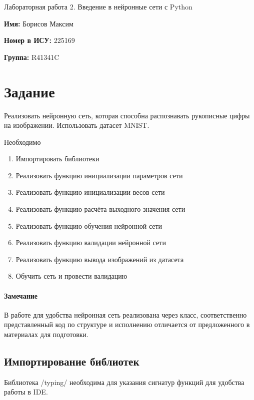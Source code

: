 \documentclass[14pt]{extarticle}
\begin{document}
    \begin{center}
        \Large Лабораторная работа 2. Введение в нейронные сети с Python
    \end{center}
    \begin{flushleft}
        \textbf{Имя:} Борисов Максим

        \vspace{1em}
        \textbf{Номер в ИСУ:} 225169

        \vspace{1em}
        \textbf{Группа:} R41341C
    \end{flushleft}

    \section*{Задание}
    Реализовать нейронную сеть, которая способна распознавать рукописные цифры
    на изображении. Использовать датасет MNIST.

    \vspace{1em}
    Необходимо
    \begin{enumerate}
        \item Импортировать библиотеки
        \item Реализовать функцию инициализации параметров сети
        \item Реализовать функцию инициализации весов сети
        \item Реализовать функцию расчёта выходного значения сети
        \item Реализовать функцию обучения нейронной сети
        \item Реализовать функцию валидации нейронной сети
        \item Реализовать функцию вывода изображений из датасета
        \item Обучить сеть и провести валидацию
    \end{enumerate}

    \pagebreak

    \paragraph*{Замечание}
    В работе для удобства нейронная сеть реализована через класс, соответственно представленный код
    по структуре и исполнению отличается от предложенного в материалах для подготовки.

    \subsection{Импортирование библиотек}
    Библиотека \pythoninline/typing/ необходима для указания сигнатур функций для удобства работы в IDE.
\end{document}
